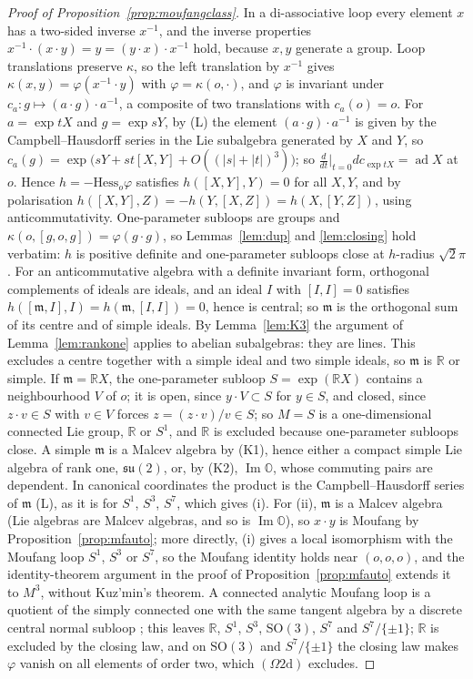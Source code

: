 \documentclass[11pt,reqno]{amsart}
\theoremstyle{definition}
\theoremstyle{remark}
\numberwithin{equation}{section}
\newcommand{\R}{\mathbb{R}}
\newcommand{\su}{\mathfrak{su}}
\newcommand{\ad}{\operatorname{ad}}
\newcommand{\im}{\operatorname{Im}}
\newcommand{\hp}[3]{[#1,#2,#3]}
\newcommand{\SO}{\mathrm{SO}}
\begin{document}
\begin{proof}[Proof of Proposition~\ref{prop:moufangclass}]
In a di-associative loop every element $x$ has a two-sided inverse $x^{-1}$, and the inverse properties
$x^{-1}\cdot(x\cdot y)=y=(y\cdot x)\cdot x^{-1}$ hold, because $x,y$ generate a group.  Loop translations preserve $\kappa$, so the left
translation by $x^{-1}$ gives $\kappa(x,y)=\varphi(x^{-1}\cdot y)$ with $\varphi=\kappa(o,\cdot)$, and $\varphi$ is invariant under
$c_a\colon g\mapsto(a\cdot g)\cdot a^{-1}$, a composite of two translations with $c_a(o)=o$.  For $a=\exp tX$ and $g=\exp sY$,
by (L) the element $(a\cdot g)\cdot a^{-1}$ is given by the Campbell--Hausdorff series in the Lie subalgebra generated by $X$ and
$Y$, so $c_a(g)=\exp\bigl(sY+st[X,Y]+O((\lvert s\rvert+\lvert t\rvert)^3)\bigr)$; so $\frac{d}{dt}\big|_{t=0}dc_{\exp tX}=\ad X$ at $o$.  Hence
$h=-\mathrm{Hess}_o\varphi$ satisfies $h([X,Y],Y)=0$ for all $X,Y$, and by polarisation $h([X,Y],Z)=-h(Y,[X,Z])=h(X,[Y,Z])$,
using anticommutativity.  One-parameter subloops are groups and $\kappa(o,\hp gog)=\varphi(g\cdot g)$, so Lemmas~\ref{lem:dup} and
\ref{lem:closing} hold verbatim: $h$ is positive definite and one-parameter subloops close at $h$-radius $\sqrt2\pi$.  For an
anticommutative algebra with a definite invariant form, orthogonal complements of ideals are ideals, and an ideal $I$
with $[I,I]=0$ satisfies $h([\mathfrak m,I],I)=h(\mathfrak m,[I,I])=0$, hence is central; so $\mathfrak m$ is the orthogonal sum of its
centre and of simple ideals.  By Lemma~\ref{lem:K3} the argument of Lemma~\ref{lem:rankone} applies to abelian
subalgebras: they are lines.  This excludes a centre together with a simple ideal and two simple ideals, so $\mathfrak m$ is
$\R$ or simple.  If $\mathfrak m=\R X$, the one-parameter subloop $S=\exp(\R X)$ contains a neighbourhood $V$ of $o$; it is open,
since $y\cdot V\subset S$ for $y\in S$, and closed, since $z\cdot v\in S$ with $v\in V$ forces $z=(z\cdot v)/v\in S$; so $M=S$ is a
one-dimensional connected Lie group, $\R$ or $S^1$, and $\R$ is excluded because one-parameter subloops close.  A simple $\mathfrak m$ is a Malcev algebra by (K1), hence either a compact simple Lie algebra of rank one,
$\su(2)$, or, by (K2), $\im\mathbb O$, whose commuting pairs are dependent.  In canonical coordinates the product is the
Campbell--Hausdorff series of $\mathfrak m$ (L), as it is for $S^1$, $S^3$, $S^7$, which gives (i).  For (ii), $\mathfrak m$ is a Malcev algebra
(Lie algebras are Malcev algebras, and so is $\im\mathbb O$), so $x\cdot y$ is Moufang by Proposition~\ref{prop:mfauto}; more directly, (i) gives a
local isomorphism with the Moufang loop $S^1$, $S^3$ or $S^7$, so the Moufang identity holds near $(o,o,o)$, and the identity-theorem argument
in the proof of Proposition~\ref{prop:mfauto} extends it to $M^3$, without Kuz'min's theorem.  A connected
analytic Moufang loop is a quotient of the simply connected one with the same tangent algebra by a discrete central
normal subloop \cite{Kerdman}; this leaves $\R$, $S^1$, $S^3$, $\SO(3)$, $S^7$ and $S^7/\{\pm1\}$; $\R$ is excluded by the closing law,
and on $\SO(3)$ and $S^7/\{\pm1\}$ the closing law makes $\varphi$ vanish on all elements of order two, which $(\Omega2\mathrm d)$
excludes.
\end{proof}
\end{document}
